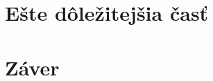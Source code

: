 \documentclass[10pt,twocolumn,twoside,slovak,a4paper]{article}
\begin{document}
\section{Ešte dôležitejšia časť} \label{dolezitejsia}




\section{Záver} \label{zaver} %





%

\end{document}
